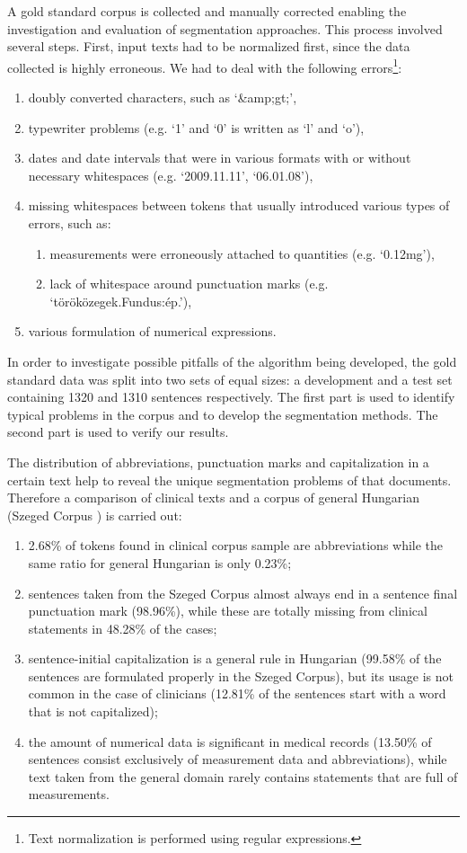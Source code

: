 A gold standard corpus is collected and manually corrected enabling the investigation and evaluation of segmentation approaches.
This process involved several steps. First, input texts had to be normalized first, since the data collected is highly erroneous.
We had to deal with the following errors\footnote{Text normalization is performed using regular expressions.}:
\begin{enumerate}
 \item doubly converted characters, such as `\&amp;gt;',
 \item typewriter problems (e.g. `1' and `0' is written as `l' and `o'),
 \item dates and date intervals that were in various formats with or without necessary whitespaces (e.g. `2009.11.11', `06.01.08'),
 \item missing whitespaces between tokens that usually introduced various types of errors, such as:
 \begin{enumerate}
  \item measurements 
  were erroneously attached to quantities (e.g. `0.12mg'),
  \item lack of whitespace around punctuation marks (e.g. `töröközegek.Fundus:ép.'),
 \end{enumerate}
 \item various formulation of numerical expressions.
\end{enumerate}
 
In order to investigate possible pitfalls of the algorithm being developed, the gold standard data was split into two sets of equal sizes: a development and a test set containing 1320 and 1310 sentences respectively. 
The first part is used to identify typical problems in the corpus and to develop the segmentation methods. The second part is used to verify our results. 

The distribution of abbreviations, punctuation marks and capitalization in a certain text help to reveal the unique segmentation problems of that documents. Therefore a comparison of clinical texts and a corpus of general Hungarian (Szeged Corpus \cite{Csendes2004}) is carried out: 
\begin{enumerate}
 \item 2.68\% of tokens found in clinical corpus sample are abbreviations while the same ratio for general Hungarian is only 0.23\%; 
 \item sentences taken from the Szeged Corpus almost always end in a sentence final punctuation mark (98.96\%), while these are totally missing from clinical statements in 48.28\% of the cases; 
 \item sentence-initial capitalization is a general rule in Hungarian (99.58\% of the sentences are formulated properly in the Szeged Corpus), but its usage is not common in the case of clinicians (12.81\% of the sentences start with a word that is not capitalized); 
 \item the amount of numerical data is significant in medical records (13.50\% of sentences consist exclusively of measurement data and abbreviations), while text taken from the general domain rarely contains statements that are full of measurements. 
\end{enumerate}

